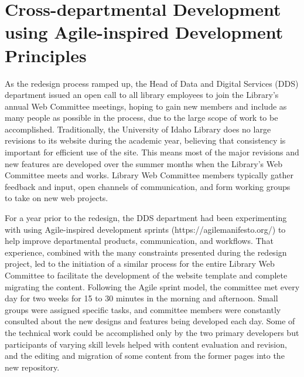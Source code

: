 \documentclass{book}
\begin{document}
\hypertarget{cross-departmental-development-using-agile-inspired-development-principles}{%
\section{Cross-departmental Development using Agile-inspired Development
Principles}\label{cross-departmental-development-using-agile-inspired-development-principles}}

As the redesign process ramped up, the Head of Data and Digital Services (DDS)
department issued an open call to all library employees to join the Library's
annual Web Committee meetings, hoping to gain new members and include as many
people as possible in the process, due to the large scope of work to be
accomplished. Traditionally, the University of Idaho Library does no large
revisions to its website during the academic year, believing that consistency
is important for efficient use of the site. This means most of the major
revisions and new features are developed over the summer months when the
Library's Web Committee meets and works. Library Web Committee members
typically gather feedback and input, open channels of communication, and form
working groups to take on new web projects.

For a year prior to the redesign, the DDS department had been experimenting
with using Agile-inspired development sprints (https://agilemanifesto.org/) to
help improve departmental products, communication, and workflows. That
experience, combined with the many constraints presented during the redesign
project, led to the initiation of a similar process for the entire Library Web
Committee to facilitate the development of the website template and complete
migrating the content. Following the Agile sprint model, the committee met
every day for two weeks for 15 to 30 minutes in the morning and afternoon.
Small groups were assigned specific tasks, and committee members were
constantly consulted about the new designs and features being developed each
day. Some of the technical work could be accomplished only by the two primary
developers but participants of varying skill levels helped with content
evaluation and revision, and the editing and migration of some content from
the former pages into the new repository.
\end{document}
